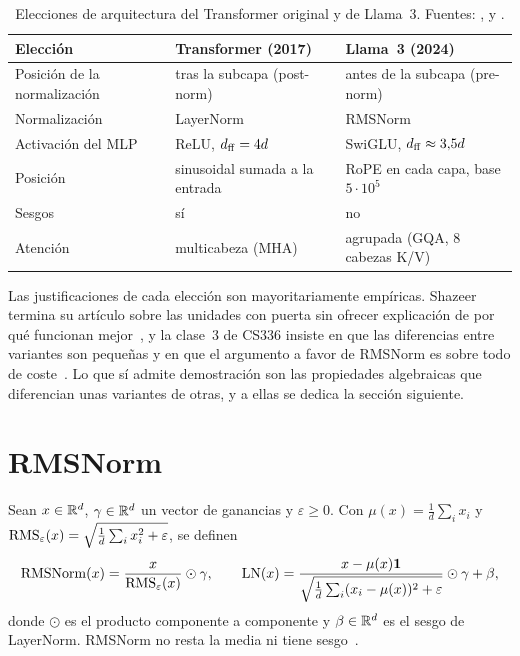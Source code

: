\begin{table}[ht]
\centering\small
\caption{Elecciones de arquitectura del Transformer original y de Llama~3. Fuentes: \cite[§3]{vaswani}, \cite[§3.2 y tabla~3]{llama3} y \cite{cs336}.}\label{tab:consenso}
\begin{tabular}{@{}lll@{}}
\toprule
Elección & Transformer (2017) & Llama~3 (2024) \\
\midrule
Posición de la normalización & tras la subcapa (post-norm) & antes de la subcapa (pre-norm) \\
Normalización & LayerNorm & RMSNorm \\
Activación del MLP & ReLU, $d_{\mathrm{ff}}=4d$ & SwiGLU, $d_{\mathrm{ff}}\approx 3{,}5d$ \\
Posición & sinusoidal sumada a la entrada & RoPE en cada capa, base $5\cdot 10^{5}$ \\
Sesgos & sí & no \\
Atención & multicabeza (MHA) & agrupada (GQA, 8 cabezas K/V) \\
\bottomrule
\end{tabular}
\end{table}

\begin{observacion}
Las justificaciones de cada elección son mayoritariamente empíricas. Shazeer termina su artículo sobre las unidades con puerta sin ofrecer explicación de por qué funcionan mejor~\cite[§4]{shazeerglu}, y la clase~3 de CS336 insiste en que las diferencias entre variantes son pequeñas y en que el argumento a favor de RMSNorm es sobre todo de coste~\cite{cs336}. Lo que sí admite demostración son las propiedades algebraicas que diferencian unas variantes de otras, y a ellas se dedica la sección siguiente.
\end{observacion}

\section{RMSNorm}

\begin{definicion}\label{def:rmsnorm}
Sean $x\in\mathbb{R}^{d}$, $\gamma\in\mathbb{R}^{d}$ un vector de ganancias y $\varepsilon\ge 0$. Con $\mu(x)=\frac1d\sum_i x_i$ y $\operatorname{RMS}_\varepsilon(x)=\sqrt{\frac1d\sum_i x_i^{2}+\varepsilon}$, se definen
\[
\operatorname{RMSNorm}(x)=\frac{x}{\operatorname{RMS}_\varepsilon(x)}\odot\gamma,\qquad
\operatorname{LN}(x)=\frac{x-\mu(x)\mathbf{1}}{\sqrt{\frac1d\sum_i(x_i-\mu(x))^{2}+\varepsilon}}\odot\gamma+\beta,
\]
donde $\odot$ es el producto componente a componente y $\beta\in\mathbb{R}^{d}$ es el sesgo de LayerNorm. RMSNorm no resta la media ni tiene sesgo~\cite[§4, ec.~4]{rmsnorm}.
\end{definicion}

